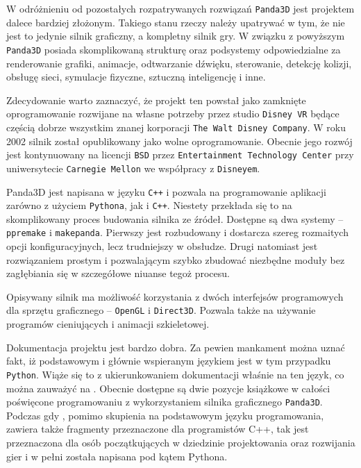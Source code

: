 \documentclass[11pt]{mwrep}
\begin{document}
      W odróżnieniu od pozostałych rozpatrywanych rozwiązań \texttt{Panda3D} jest projektem dalece bardziej złożonym. Takiego stanu rzeczy należy upatrywać w tym, że nie jest to jedynie silnik graficzny, a kompletny silnik gry. W związku z powyższym \texttt{Panda3D} posiada skomplikowaną strukturę oraz podsystemy odpowiedzialne za renderowanie grafiki, animacje, odtwarzanie dźwięku, sterowanie, detekcję kolizji, obsługę sieci, symulacje fizyczne, sztuczną inteligencję i inne.

      Zdecydowanie warto zaznaczyć, że projekt ten powstał jako zamknięte oprogramowanie rozwijane na własne potrzeby przez studio \texttt{Disney VR} będące częścią dobrze wszystkim znanej korporacji \texttt{The Walt Disney Company}. W roku 2002 silnik został opublikowany jako wolne oprogramowanie. Obecnie jego rozwój jest kontynuowany na licencji \texttt{BSD} przez \texttt{Entertainment Technology Center} przy uniwersytecie \texttt{Carnegie Mellon} we współpracy z \texttt{Disneyem}.

      Panda3D jest napisana w języku \texttt{C++} i pozwala na programowanie aplikacji zarówno z użyciem \texttt{Pythona}, jak i \texttt{C++}. Niestety przekłada się to na skomplikowany proces budowania silnika ze źródeł. Dostępne są dwa systemy -- \texttt{ppremake} i \texttt{makepanda}. Pierwszy jest rozbudowany i dostarcza szereg rozmaitych opcji konfiguracyjnych, lecz trudniejszy w obsłudze. Drugi natomiast jest rozwiązaniem prostym i pozwalającym szybko zbudować niezbędne moduły bez zagłębiania się w szczegółowe niuanse tegoż procesu.

      Opisywany silnik ma możliwość korzystania z dwóch interfejsów programowych dla sprzętu graficznego -- \texttt{OpenGL} i \texttt{Direct3D}. Pozwala także na używanie programów cieniujących i animacji szkieletowej.

      Dokumentacja projektu jest bardzo dobra. Za pewien mankament można uznać fakt, iż podstawowym i głównie wspieranym językiem jest w tym przypadku \texttt{Python}. Wiąże się to z ukierunkowaniem dokumentacji właśnie na ten język, co można zauważyć na \cite{panda}. Obecnie dostępne są dwie pozycje książkowe w całości poświęcone programowaniu z wykorzystaniem silnika graficznego \texttt{Panda3D}. Podczas gdy \cite{pandab1}, pomimo skupienia na podstawowym języku programowania, zawiera także fragmenty przeznaczone dla programistów C++, tak \cite{pandab2} jest przeznaczona dla osób początkujących w dziedzinie projektowania oraz rozwijania gier i w pełni została napisana pod kątem Pythona.
\end{document}
